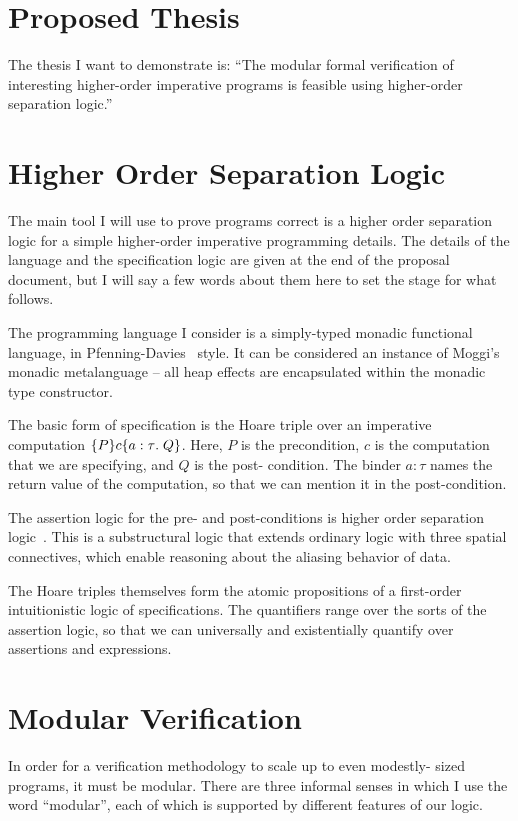 \section{Proposed Thesis}

The thesis I want to demonstrate is: ``The modular formal verification
of interesting higher-order imperative programs is feasible using
higher-order separation logic.''

\section{Higher Order Separation Logic}

The main tool I will use to prove programs correct is a higher order
separation logic for a simple higher-order imperative programming
details. The details of the language and the specification logic are
given at the end of the proposal document, but I will say a few words
about them here to set the stage for what follows. 

The programming language I consider is a simply-typed monadic
functional language, in Pfenning-Davies~\cite{pfenning-davies}
style. It can be considered an instance of Moggi's ~\cite{moggi}
monadic metalanguage -- all heap effects are encapsulated within the
monadic type constructor.

The basic form of specification is the Hoare triple over an imperative
computation $\{{P}\}{c}\{{a:\tau}.\;{Q}\}$. Here, $P$ is the precondition,
$c$ is the computation that we are specifying, and $Q$ is the post-
condition. The binder $a:\tau$ names the return value of the computation,
so that we can mention it in the post-condition. 

The assertion logic for the pre- and post-conditions is higher order
separation logic~\cite{hosl}. This is a substructural logic that 
extends ordinary logic with three spatial connectives, which enable
reasoning about the aliasing behavior of data. 

The Hoare triples themselves form the atomic propositions of a
first-order intuitionistic logic of specifications. The quantifiers
range over the sorts of the assertion logic, so that we can
universally and existentially quantify over assertions and
expressions.


\section{Modular Verification}

In order for a verification methodology to scale up to even modestly-
sized programs, it must be modular. There are three informal senses in
which I use the word ``modular'', each of which is supported by
different features of our logic.

